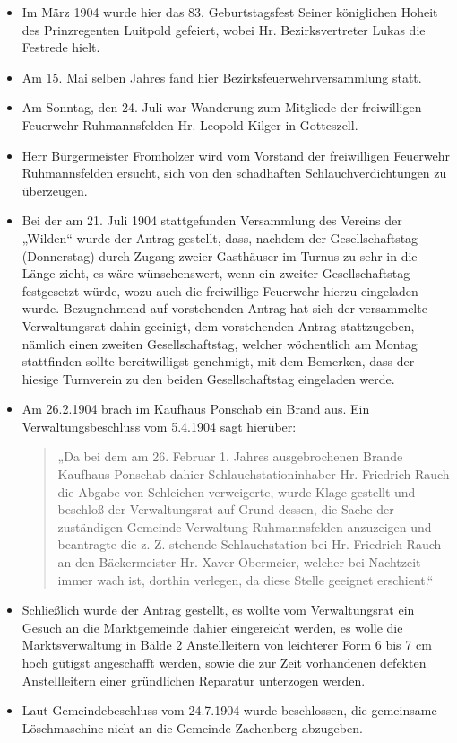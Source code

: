 \documentclass[12pt,a4paper]{book}
\begin{document}
\begin{itemize}
\item Im März 1904 wurde hier das 83. Geburtstagsfest Seiner königlichen Hoheit
des Prinzregenten Luitpold gefeiert, wobei Hr. Bezirksvertreter Lukas die
Festrede hielt.

\item Am 15. Mai selben Jahres fand hier Bezirksfeuerwehrversammlung statt.

\item Am Sonntag, den 24. Juli war Wanderung zum Mitgliede der freiwilligen
Feuerwehr Ruhmannsfelden Hr. Leopold Kilger in Gotteszell.

\item Herr Bürgermeister Fromholzer wird vom Vorstand der freiwilligen Feuerwehr
Ruhmannsfelden ersucht, sich von den schadhaften Schlauchverdichtungen zu
überzeugen.

\item Bei der am 21. Juli 1904 stattgefunden Versammlung des Vereins der
„Wilden“ wurde der Antrag gestellt, dass, nachdem der Gesellschaftstag
(Donnerstag) durch Zugang zweier Gasthäuser im Turnus zu sehr in die Länge
zieht, es wäre wünschenswert, wenn ein zweiter Gesellschaftstag festgesetzt
würde, wozu auch die freiwillige Feuerwehr hierzu eingeladen wurde. Bezugnehmend
auf vorstehenden Antrag hat sich der versammelte Verwaltungsrat dahin geeinigt,
dem vorstehenden Antrag stattzugeben, nämlich einen zweiten Gesellschaftstag,
welcher wöchentlich am Montag stattfinden sollte bereitwilligst genehmigt, mit
dem Bemerken, dass der hiesige Turnverein zu den beiden Gesellschaftstag
eingeladen werde.

\item Am 26.2.1904 brach im Kaufhaus Ponschab ein Brand aus. Ein
Verwaltungsbeschluss vom 5.4.1904 sagt hierüber:

\begin{quote}
„Da bei dem am 26. Februar 1. Jahres ausgebrochenen Brande Kaufhaus Ponschab
dahier Schlauchstationinhaber Hr. Friedrich Rauch die Abgabe von Schleichen
verweigerte, wurde Klage gestellt und beschloß der Verwaltungsrat auf Grund
dessen, die Sache der zuständigen Gemeinde Verwaltung Ruhmannsfelden anzuzeigen
und beantragte die z. Z. stehende Schlauchstation bei Hr. Friedrich Rauch an den
Bäckermeister Hr. Xaver Obermeier, welcher bei Nachtzeit immer wach ist, dorthin
verlegen, da diese Stelle geeignet erschient.“
\end{quote}

\item Schließlich wurde der Antrag gestellt, es wollte vom Verwaltungsrat ein
Gesuch an die Marktgemeinde dahier eingereicht werden, es wolle die
Marktsverwaltung in Bälde 2 Anstellleitern von leichterer Form 6 bis 7 cm hoch
gütigst angeschafft werden, sowie die zur Zeit vorhandenen defekten
Anstellleitern einer gründlichen Reparatur unterzogen werden.

\item Laut Gemeindebeschluss vom 24.7.1904 wurde beschlossen, die gemeinsame
Löschmaschine nicht an die Gemeinde Zachenberg abzugeben.
\end{itemize}
\end{document}
